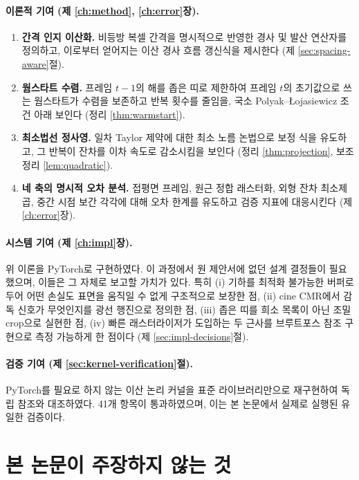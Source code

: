 \paragraph{이론적 기여 (제 \ref{ch:method}, \ref{ch:error}장).}
\begin{enumerate}[leftmargin=2em]
  \item \textbf{간격 인지 이산화.} 비등방 복셀 간격을 명시적으로 반영한 경사 및
  발산 연산자를 정의하고, 이로부터 얻어지는 이산 경사 흐름 갱신식을 제시한다
  (제 \ref{sec:spacing-aware}절).
  \item \textbf{웜스타트 수렴.} 프레임 $t-1$의 해를 좁은 띠로 제한하여 프레임 $t$의
  초기값으로 쓰는 웜스타트가 수렴을 보존하고 반복 횟수를 줄임을, 국소
  Polyak--{\L}ojasiewicz 조건 아래 보인다 (정리 \ref{thm:warmstart}).
  \item \textbf{최소법선 정사영.} 일차 Taylor 제약에 대한 최소 노름 논법으로 보정
  식을 유도하고, 그 반복이 잔차를 이차 속도로 감소시킴을 보인다
  (정리 \ref{thm:projection}, 보조정리 \ref{lem:quadratic}).
  \item \textbf{네 축의 명시적 오차 분석.} 접평면 프레임, 원근 정합 래스터화,
  외형 잔차 최소제곱, 중간 시점 보간 각각에 대해 오차 한계를 유도하고 검증
  지표에 대응시킨다 (제 \ref{ch:error}장).
\end{enumerate}

\paragraph{시스템 기여 (제 \ref{ch:impl}장).}
위 이론을 PyTorch로 구현하였다. 이 과정에서 원 제안서에 없던 설계 결정들이
필요했으며, 이들은 그 자체로 보고할 가치가 있다. 특히 (i) 기하를 최적화 불가능한
버퍼로 두어 어떤 손실도 표면을 움직일 수 없게 구조적으로 보장한 점,
(ii) cine CMR에서 감독 신호가 무엇인지를 광선 행진으로 정의한 점,
(iii) 좁은 띠를 희소 목록이 아닌 조밀 crop으로 실현한 점,
(iv) 빠른 래스터라이저가 도입하는 두 근사를 브루트포스 참조 구현으로 측정 가능하게
한 점이다 (제 \ref{sec:impl-decisions}절).

\paragraph{검증 기여 (제 \ref{sec:kernel-verification}절).}
PyTorch를 필요로 하지 않는 이산 논리 커널을 표준 라이브러리만으로 재구현하여
독립 참조와 대조하였다. 41개 항목이 통과하였으며, 이는 본 논문에서 실제로
실행된 유일한 검증이다.

\section{본 논문이 주장하지 않는 것}
\label{sec:not-claimed}

